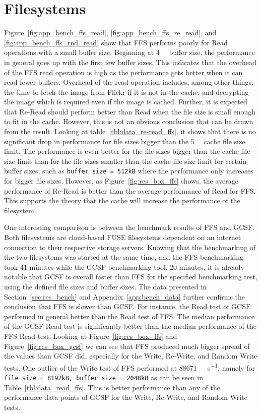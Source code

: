 \section{Filesystems}
Figure~\ref{fig:app_bench_ffs_read}, \ref{fig:app_bench_ffs_re_read}, and \ref{fig:app_bench_ffs_rnd_read} show that FFS performs poorly for Read operations with a small buffer size. Beginning at \SI{4}{\kilo\byte} buffer size, the performance in general goes up with the first few buffer sizes. This indicates that the overhead of the FFS read operation is high as the performance gets better when it can read fewer buffers. Overhead of the read operation includes, among other things, the time to fetch the image from Flickr if it is not in the cache, and decrypting the image which is required even if the image is cached. Further, it is expected that Re-Read should perform better than Read when the file size is small enough to fit in the cache. However, this is not an obvious conclusion that can be drawn from the result. Looking at table~\ref{tbl:data_re-read_ffs}, it shows that there is no significant drop in performance for file sizes bigger than the \SI{5}{\mega\byte} cache file size limit. The performance is even better for the file sizes bigger than the cache file size limit than for the file sizes smaller than the cache file size limit for certain buffer sizes, such as \texttt{buffer size = 512kB} where the performance only increases for bigger file sizes. However, as Figure~\ref{fig:res_box_ffs} shows, the average performance of Re-Read is better than the average performance of Read for FFS. This supports the theory that the cache will increase the performance of the filesystem.

One interesting comparison is between the benchmark results of FFS and GCSF. Both filesystems are cloud-based FUSE filesystems dependent on an internet connection to their respective storage servers. Knowing that the benchmarking of the two filesystems was started at the same time, and the FFS benchmarking took 41 minutes while the GCSF benchmarking took 20 minutes, it is already notable that GCSF is overall faster than FFS for the specified benchmarking test, using the defined file sizes and buffer sizes. The data presented in Section~\ref{sec:res_bench} and Appendix~\ref{app:bench_data} further confirms the conclusion that FFS is slower than GCSF. For instance, the Read test of GCSF performed in general better than the Read test of FFS. The median performance of the GCSF Read test is significantly better than the median performance of the FFS Read test. Looking at Figure~\ref{fig:res_box_ffs} and Figure~\ref{fig:res_box_gcsf} we can see that FFS produced much bigger spread of the values than GCSF did, especially for the Write, Re-Write, and Random Write tests. One outlier of the Write test of FFS performed at \SI[per-mode = symbol]{88671}{\kilo\byte\per\second}, namely for \texttt{file size = 8192kB, buffer size = 2048kB} as can be seen in Table~\ref{tbl:data_read_ffs}. This is better performance than any of the performance data points of GCSF for the Write, Re-Write, and Random Write tests.

